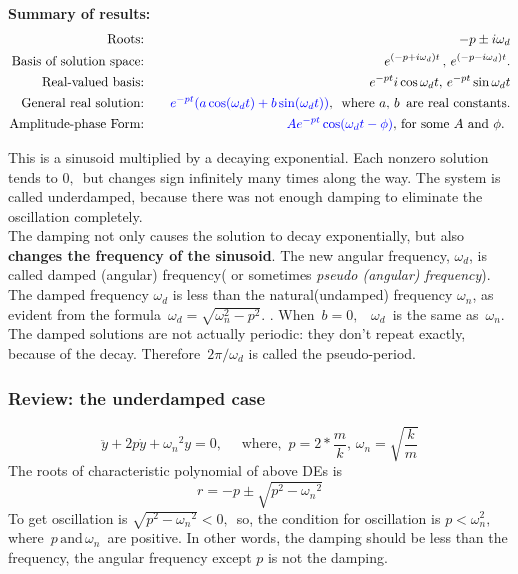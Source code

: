 \textbf{Summary of results:}
\begin{eqnarray*}
  \text{Roots:}  & \quad
  & -p \pm i \omega _ d \\
  \text{Basis of solution space:} & \quad
  & \displaystyle e^{(-p + i \omega _ d) t}\, , \, e^{(-p -i\omega _ d) t}. \\
  \text{Real-valued basis:} & \quad
  & \displaystyle e^{-p t}  i\cos \omega _ d t, \, e^{-p t} \sin \omega _ d t \\
  \text{General real solution:}	& \quad
  & \displaystyle {\color{blue}{e^{-p t} (a \cos (\omega _ d t) + b \sin (\omega _ d t))}}
    , \, \text{ where $a, \, b \, $ are real constants.} \\
  \text{Amplitude-phase Form:}	& \quad
  & \displaystyle {\color{blue}{A e^{-pt}\cos (\omega _ d t - \phi ) }}
    , \, \text{for some $A$ and $\phi$. }
\end{eqnarray*}

This is a sinusoid multiplied by a decaying exponential. Each nonzero solution tends to $0 , \,$
but changes sign infinitely many times along the way.
The system is called {\color{blue} underdamped}, because there was not enough damping
to eliminate the oscillation completely.\\

The damping not only causes the solution to decay exponentially, but also
\textbf{ changes the frequency of the sinusoid}.
The new angular frequency, $\omega _ d$, is called {\color{blue}damped (angular) frequency}( or
sometimes \textit{pseudo (angular) frequency}). \\

The damped frequency $\omega _d$ is less than the natural(undamped) frequency $\omega _n$, as evident
from the formula $\, \omega _ d=\sqrt {\omega _ n^2-p^2}.\, \,$.
When $\, b=0,$ \, $\omega _ d\,$ is the same as $\, \omega _ n$. \\

The damped solutions are not actually periodic:
they don't repeat exactly, because of the decay.
Therefore $\, 2\pi /\omega _ d$  is called the {\color{blue}pseudo-period}.

\subsubsection{Review: the underdamped case}

\begin{equation*}
  \ddot{y} + 2p \dot{y} + {\omega _n}^2 y = 0,
  \quad \text{ where, } \, p = 2 * \frac{m}{k} , \, \omega _n = \sqrt{\frac{k}{m}} 
\end{equation*}
The roots of characteristic polynomial of above DEs is
\begin{equation*}
  r = -p \pm \sqrt{p^2 - {\omega _n}^2}
\end{equation*}
To get oscillation is $ \sqrt{p^2 - {\omega _n}^2} < 0 ,\,$
so, the condition for oscillation is $ p < \omega _n ^2 , \, $
where $\, p \, \text{and} \, \omega _n \, $ are positive.
In other words,  the damping should be less than the frequency,
the angular frequency except $p$ is not the damping.\\

